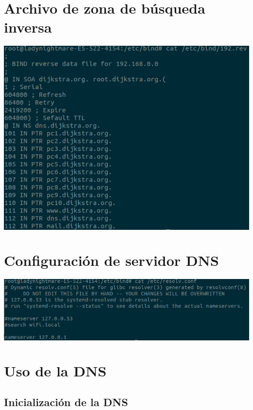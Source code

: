 \documentclass{article}
\begin{document}
\section{Archivo de zona de búsqueda inversa}

\begin{center}
	\includegraphics[scale=0.5]{inv.png} 
\end{center}

\section{Configuración de servidor DNS}

\begin{center}
	\includegraphics[scale=0.5]{resolv.png} 
\end{center}

\section{Uso de la DNS}

\subsection{Inicialización de la DNS}
\end{document}
